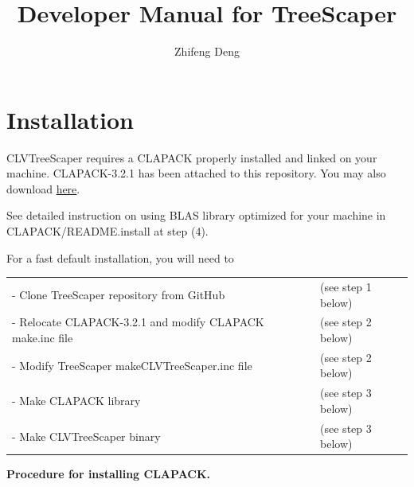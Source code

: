 \documentclass[11pt,a4paper]{article}
\title{Developer Manual for TreeScaper}
\author{Zhifeng Deng}
\theoremstyle{definition}
\theoremstyle{definition}
\numberwithin{equation}{section}
\begin{document}
	\maketitle

	
	
	\section{Installation}
	

	CLVTreeScaper requires a CLAPACK properly installed and linked on your machine. 
	CLAPACK-3.2.1 has been attached to this repository. You may also download \href{https://www.netlib.org/clapack/}{here}.
	
	
	
	See detailed instruction on using BLAS library optimized for your machine in 
	CLAPACK/README.install at step (4).
	
	
	
	For a fast default installation, you will need to
	\begin{table}[!h]
		\begin{tabular}{ll}
			- Clone TreeScaper repository from GitHub                   &(see step 1 below)\\
			- Relocate CLAPACK-3.2.1 and modify CLAPACK make.inc file   &(see step 2 below)\\
			- Modify TreeScaper makeCLVTreeScaper.inc file              &(see step 2 below)\\
			- Make CLAPACK library                                      &(see step 3 below)\\
			- Make CLVTreeScaper binary                                 &(see step 3 below)\\
		\end{tabular}
	\end{table}
	
	
	
	\textbf{Procedure for installing CLAPACK.}
	
	
	
\end{document}
